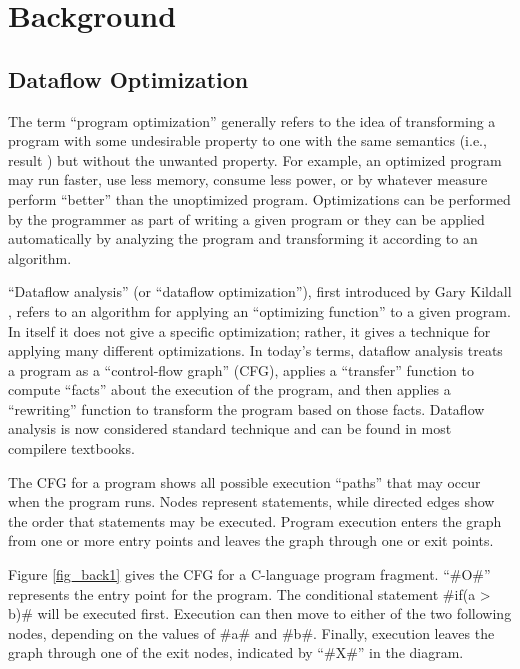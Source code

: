 \documentclass[12pt]{report}
\begin{document}


\chapter{Background}



\section{Dataflow Optimization}

The term ``program optimization'' generally refers to the idea of
transforming a program with some undesirable property to one with the
same semantics (i.e., result ) but without the unwanted property.  For
example, an optimized program may run faster, use less memory, consume
less power, or by whatever measure perform ``better'' than the
unoptimized program. Optimizations can be performed by the programmer
as part of writing a given program or they can be applied
automatically by analyzing the program and transforming it according
to an algorithm.

``Dataflow analysis'' (or ``dataflow optimization''), first introduced
by Gary Kildall \citep{Kildall1973}, refers to an algorithm for
applying an ``optimizing function'' to a given program. In itself it
does not give a specific optimization; rather, it gives a technique
for applying many different optimizations. In today's terms, dataflow
analysis treats a program as a ``control-flow graph'' (CFG), applies a
``transfer'' function to compute ``facts'' about the execution of the
program, and then applies a ``rewriting'' function to transform the
program based on those facts. Dataflow analysis is now considered
standard technique and can be found in most compilere textbooks.

The CFG for a program shows all possible execution ``paths'' that may
occur when the program runs. Nodes represent statements, while
directed edges show the order that statements may be executed.
Program execution enters the graph from one or more entry points and
leaves the graph through one or exit points.  

Figure \ref{fig_back1} gives the CFG for a C-language program
fragment.  ``#O#'' represents the entry point for the program. The
conditional statement #if(a > b)# will be executed first. Execution
can then move to either of the two following nodes, depending on the
values of #a# and #b#. Finally, execution leaves the graph through one of
the exit nodes, indicated by ``#X#'' in the diagram.
\end{document}
